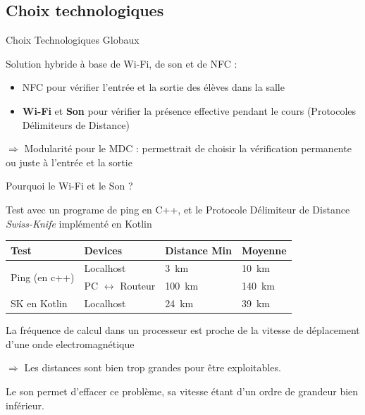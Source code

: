 \documentclass[aspectratio=169]{beamer}
\begin{document}
\subsection{Choix technologiques}

\begin{frame}{Choix Technologiques Globaux}

  Solution hybride à base de Wi-Fi, de son et de NFC :
  \begin{itemize}
    \item NFC pour vérifier l'entrée et la sortie des élèves dans la salle
    \item \textbf{Wi-Fi} et \textbf{Son} pour vérifier la présence effective pendant le cours (Protocoles Délimiteurs de Distance)
  \end{itemize}

  \bigskip
  
  $\Rightarrow$ Modularité pour le MDC : permettrait de choisir la vérification permanente ou juste à l'entrée et la sortie


\end{frame}

\begin{frame}{Pourquoi le Wi-Fi et le Son ?}

  Test avec un programe de ping en C++, et le Protocole Délimiteur de Distance \textit{Swiss-Knife} implémenté en Kotlin

  \begin{table}[]
    \centering
    \begin{tabular}{|l|l|l|l|}
    \hline
    \textbf{Test}                                        & \textbf{Devices}             & \textbf{Distance Min} & \textbf{Moyenne}      \\ \hline
    \multicolumn{1}{|c|}{\multirow{2}{*}{Ping (en c++)}} & Localhost                    & \SI{3}{\kilo\meter}   & \SI{10}{\kilo\meter}  \\ \cline{2-4} 
    \multicolumn{1}{|c|}{}                               & PC $\leftrightarrow$ Routeur & \SI{100}{\kilo\meter} & \SI{140}{\kilo\meter} \\ \hline
    SK en Kotlin                                         & Localhost                    & \SI{24}{\kilo\meter}  & \SI{39}{\kilo\meter}  \\ \hline
    \end{tabular}
  \end{table}

  \bigskip

  La fréquence de calcul dans un processeur est proche de la vitesse de déplacement d'une onde electromagnétique
  
  $\Rightarrow$ Les distances sont bien trop grandes pour être exploitables.

  \bigskip

  Le son permet d'effacer ce problème, sa vitesse étant d'un ordre de grandeur bien inférieur.

\end{frame}
\end{document}
